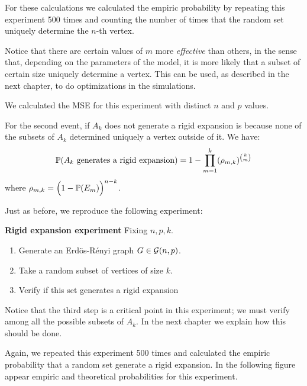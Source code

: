 For these calculations we calculated the empiric probability by repeating this experiment 500 times and counting the number of times that the random set uniquely determine the $n$-th vertex.

Notice that there are certain values of $m$ more \textit{effective} than others, in the sense that, depending on the parameters of the model, it is more likely that a subset of certain size uniquely determine a vertex. This can be used, as described in the next chapter, to do optimizations in the simulations.
 
We calculated the MSE for this experiment with distinct $n$ and $p$ values.

\vspace{0.3cm}

\vspace{-0.3cm}
 
For the second event, if $A_k$ does not generate a rigid expansion is because none of the subsets of $A_{k}$ determined uniquely a vertex outside of it. We have:
$$\P(A_k \text{ generates a rigid expansion}) = 1 -  \prod_{m=1}^{k} (\rho_{m,k})^{\binom{k}{m}}$$
where $\rho_{m,k} = \Big(1 -  \P(E_m)\Big)^{n-k}$.

Just as before, we reproduce the following experiment:
 
\begin{cajita}
\textbf{Rigid expansion experiment} \hfill \break
Fixing $n,p,k$.
\begin{enumerate}
\item Generate an Erdös-Rényi graph $G\in \G(n,p)$.
\item Take a random subset of vertices of size $k$.
\item Verify if this set generates a rigid expansion
\end{enumerate}
\end{cajita}

Notice that the third step is a critical point in this experiment; we must verify among all the possible subsets of $A_{k}$. In the next chapter we explain how this should be done.

Again, we repeated this experiment 500 times and calculated the empiric probability that a random set generate a rigid expansion. In the following figure appear empiric and theoretical probabilities for this experiment.

